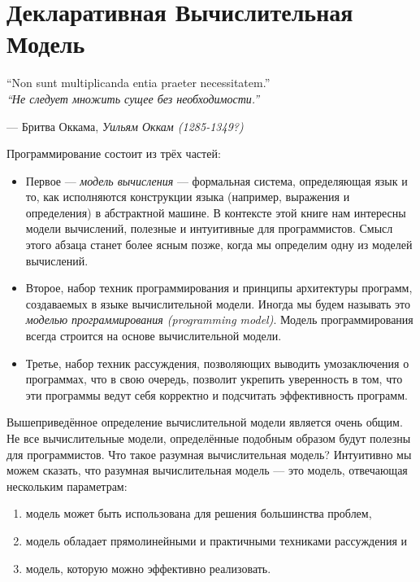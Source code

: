\chapter{Декларативная Вычислительная Модель}

\epigraph{``Non sunt multiplicanda entia praeter necessitatem.'' \\ \emph{``Не следует множить сущее без необходимости.''}}{--- Бритва Оккама, \emph{Уильям Оккам (1285-1349?)}}

Программирование состоит из трёх частей:

\begin{itemize}
\item{Первое --- \emph{модель вычисления} --- формальная система, определяющая язык и то, как исполняются конструкции языка (например, выражения и определения) в абстрактной машине. В контексте этой книге нам интересны модели вычислений, полезные и интуитивные для программистов. Смысл этого абзаца станет более ясным позже, когда мы определим одну из моделей вычислений.}

\item{Второе, набор техник программирования и принципы архитектуры программ, создаваемых в языке вычислительной модели. Иногда мы будем называть это \emph{моделью программирования (programming model)}. Модель программирования всегда строится на основе вычислительной модели.}

\item{Третье, набор техник рассуждения, позволяющих выводить умозаключения о программах, что в свою очередь, позволит укрепить уверенность в том, что эти программы ведут себя корректно и подсчитать эффективность программ.}
\end{itemize}

Вышеприведённое определение вычислительной модели является очень общим. Не все вычислительные модели, определённые подобным образом будут полезны для программистов. Что такое разумная вычислительная модель? Интуитивно мы можем сказать, что разумная вычислительная модель --- это модель, отвечающая нескольким параметрам:

\begin{enumerate}
\item{модель может быть использована для решения большинства проблем,}
\item{модель обладает прямолинейными и практичными техниками рассуждения и}
\item{модель, которую можно эффективно реализовать.}
\end{enumerate}

